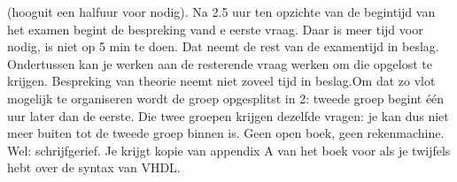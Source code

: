 \documentclass[10pt,a4paper]{book}
\begin{document}
(hooguit een halfuur voor nodig). Na 2.5 uur ten opzichte van de begintijd van het examen begint de bespreking vand e eerste vraag. Daar is meer tijd voor nodig, is niet op 5 min te doen. Dat neemt de rest van de examentijd in beslag. Ondertussen kan je werken aan de resterende vraag werken om die opgelost te krijgen. Bespreking van theorie neemt niet zoveel tijd in beslag.Om dat zo vlot mogelijk te organiseren wordt de groep opgesplitst in 2: tweede groep begint \'e\'en uur later dan de eerste. Die twee groepen krijgen dezelfde vragen: je kan dus niet meer buiten tot de tweede groep binnen is. Geen open boek, geen rekenmachine. Wel: schrijfgerief. Je krijgt kopie van appendix A van het boek voor als je twijfels hebt over de syntax van VHDL.
\end{document}
